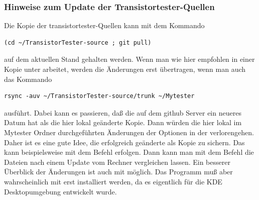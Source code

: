\subsubsection{Hinweise zum Update der Transistortester-Quellen}
Die Kopie der transistortester-Quellen kann mit dem Kommando
\begin{large} \vspace{-0.4em} \begin{verbatim}
(cd ~/TransistorTester-source ; git pull)
\end{verbatim} \end{large}
auf dem aktuellen Stand gehalten werden.
Wenn man wie hier empfohlen in einer Kopie unter  arbeitet,
werden die Änderungen erst übertragen, wenn man auch das Kommando
\begin{large} \vspace{-0.4em} \begin{verbatim}
rsync -auv ~/TransistorTester-source/trunk ~/Mytester
\end{verbatim} \end{large}
ausführt.
Dabei kann es passieren, daß die  auf dem github Server ein neueres Datum 
hat als die hier lokal geänderte Kopie. Dann würden die hier lokal im Mytester Ordner
durchgeführten Änderungen der Optionen in der  verlorengehen.
Daher ist es eine gute Idee, die erfolgreich geänderte  als Kopie
zu sichern. Das kann beispielsweise mit dem Befehl 
erfolgen. Dann kann man mit dem Befehl 
die Dateien nach einem Update vom Rechner vergleichen lassen.
Ein besserer Überblick der Änderungen ist auch mit 
möglich. Das Programm muß aber wahrscheinlich mit 
erst installiert werden, da es eigentlich für die KDE Desktopumgebung entwickelt wurde.

\newpage
